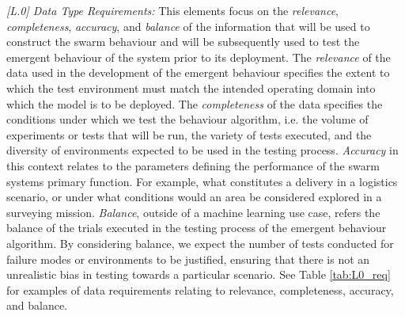 \documentclass[runningheads]{llncs}
\begin{document}
\emph{[L.0] Data Type Requirements:}
This elements focus on the \emph{relevance}, \emph{completeness}, \emph{accuracy}, and \emph{balance} of the information that will be used to construct the swarm behaviour and will be subsequently used to test the emergent behaviour of the system prior to its deployment. The \emph{relevance} of the data used in the development of the emergent behaviour specifies the extent to which the test environment must match the intended operating domain into which the model is to be deployed. The \emph{completeness} of the data specifies the conditions under which we test the behaviour algorithm, i.e. the volume of experiments or tests that will be run, the variety of tests executed, and the diversity of environments expected to be used in the testing process. \emph{Accuracy} in this context relates to the parameters defining the performance of the swarm systems primary function. For example, what constitutes a delivery in a logistics scenario, or under what conditions would an area be considered explored in a surveying mission. \emph{Balance}, outside of a machine learning use case, refers the balance of the trials executed in the testing process of the emergent behaviour algorithm. By considering balance, we expect the number of tests conducted for failure modes or environments to be justified, ensuring that there is not an unrealistic bias in testing towards a particular scenario. See Table \ref{tab:L0_req} for examples of data requirements relating to relevance, completeness, accuracy, and balance.

\end{document}
